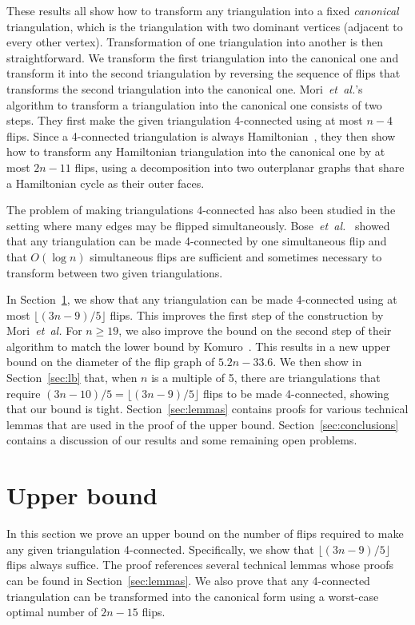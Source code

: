\pdfoutput=1 \documentclass[12pt]{elsarticle}
\newcommand{\etal}{\emph{et~al.}\xspace}
\begin{document}
These results all show how to transform any triangulation into a fixed \emph{canonical} triangulation, which is the  triangulation with two dominant vertices (adjacent to every other vertex). Transformation of one triangulation into another is then straightforward. We transform the first triangulation into the canonical one and transform it into the second triangulation by reversing the sequence of flips that transforms the second triangulation into the canonical one. Mori~\etal's algorithm to transform a triangulation into the canonical one consists of two steps. They first make the given triangulation 4-connected using at most $n - 4$ flips. Since a 4-connected triangulation is always Hamiltonian~\cite{whitney1931theorem}, they then show how to transform any Hamiltonian triangulation into the canonical one by at most $2n - 11$ flips, using a decomposition into two outerplanar graphs that share a Hamiltonian cycle as their outer faces.

The problem of making triangulations 4-connected has also been studied in the setting where many edges may be flipped simultaneously. Bose~\etal~\cite{bose2006simultaneous} showed that any triangulation can be made 4-connected by one simultaneous flip and that $O(\log n)$ simultaneous flips are sufficient and sometimes necessary to transform between two given triangulations.

In Section~\ref{sec:ub}, we show that any triangulation can be made 4-connected using at most $\lfloor(3n - 9)/5\rfloor$ flips. This improves the first step of the construction by Mori~\etal For $n \geq 19$, we also improve the bound on the second step of their algorithm to match the lower bound by Komuro~\cite{komuro1997diagonal}. This results in a new upper bound on the diameter of the flip graph of $5.2 n - 33.6$. We then show in Section~\ref{sec:lb} that, when $n$ is a multiple of 5, there are triangulations that require $(3n - 10)/5 = \lfloor(3n - 9)/5\rfloor$ flips to be made 4-connected, showing that our bound is tight. Section~\ref{sec:lemmas} contains proofs for various technical lemmas that are used in the proof of the upper bound. Section~\ref{sec:conclusions} contains a discussion of our results and some remaining open problems.

\section{Upper bound}
\label{sec:ub}

\noindent In this section we prove an upper bound on the number of flips required to make any given triangulation 4-connected. Specifically, we show that \mbox{$\lfloor(3n - 9)/5\rfloor$} flips always suffice. The proof references several technical lemmas whose proofs can be found in Section~\ref{sec:lemmas}. We also prove that any 4-connected triangulation can be transformed into the canonical form using a worst-case optimal number of $2n - 15$ flips.
\end{document}

